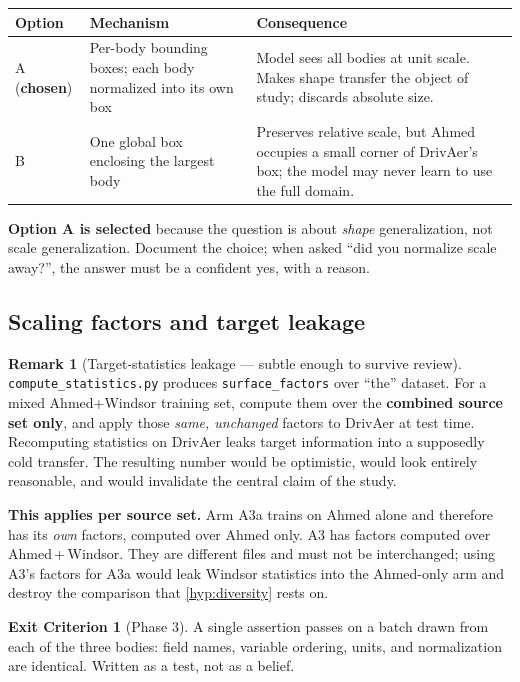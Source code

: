 \documentclass[10pt,a4paper]{article}
\theoremstyle{definition}
\newtheorem{criterion}{Exit Criterion}[section]
\newtheorem{remark}{Remark}[section]
\begin{document}
\begin{center}\small
\begin{tabular}{@{}p{2.2cm}p{5.4cm}p{6.4cm}@{}}
\toprule
\textbf{Option} & \textbf{Mechanism} & \textbf{Consequence} \\
\midrule
A (\textbf{chosen}) & Per-body bounding boxes; each body normalized into its own box
  & Model sees all bodies at unit scale. Makes shape transfer the object of study;
    discards absolute size. \\
B & One global box enclosing the largest body
  & Preserves relative scale, but Ahmed occupies a small corner of DrivAer's box;
    the model may never learn to use the full domain. \\
\bottomrule
\end{tabular}
\end{center}

\textbf{Option A is selected} because the question is about \emph{shape}
generalization, not scale generalization. Document the choice; when asked ``did you
normalize scale away?'', the answer must be a confident yes, with a reason.

\subsection{Scaling factors and target leakage}

\begin{remark}[Target-statistics leakage --- subtle enough to survive review]
\label{rem:leak}
\texttt{compute\_statistics.py} produces \texttt{surface\_factors} over ``the''
dataset. For a mixed Ahmed+Windsor training set, compute them over the
\textbf{combined source set only}, and apply those \emph{same, unchanged} factors to
DrivAer at test time. Recomputing statistics on DrivAer leaks target information
into a supposedly cold transfer. The resulting number would be optimistic, would
look entirely reasonable, and would invalidate the central claim of the study.

\textbf{This applies per source set.} Arm A3a trains on Ahmed alone and therefore has
its \emph{own} factors, computed over Ahmed only. A3 has factors computed over
Ahmed\,+\,Windsor. They are different files and must not be interchanged; using A3's
factors for A3a would leak Windsor statistics into the Ahmed-only arm and destroy the
comparison that \cref{hyp:diversity} rests on.
\end{remark}

\begin{criterion}[Phase 3]
\label{crit:p3}
A single assertion passes on a batch drawn from each of the three bodies: field
names, variable ordering, units, and normalization are identical. Written as a test,
not as a belief.
\end{criterion}
\end{document}
